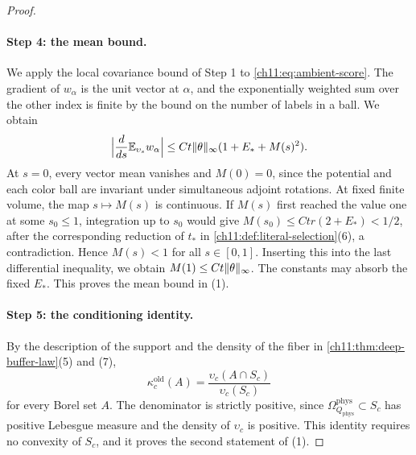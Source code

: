 \begin{proof}
\paragraph{Step 4: the mean bound.}
We apply the local covariance bound of Step 1 to \eqref{ch11:eq:ambient-score}. The gradient of $w_\alpha$ is the unit vector at $\alpha$, and the exponentially weighted sum over the other index is finite by the bound on the number of labels in a ball. We obtain
\[
 \Bigl\lvert\frac d{ds}\mathbb E_{\upsilon_s}w_\alpha\Bigr\rvert\le Ct\lVert \theta\rVert_\infty(1+E_*+M(s)^2).
\]
At $s=0$, every vector mean vanishes and $M(0)=0$, since the potential and each color ball are invariant under simultaneous adjoint rotations. At fixed finite volume, the map $s\mapsto M(s)$ is continuous. If $M(s)$ first reached the value one at some $s_0\le1$, integration up to $s_0$ would give $M(s_0)\le Ctr(2+E_*)<1/2$, after the corresponding reduction of $t_*$ in \cref{ch11:def:literal-selection}(6), a contradiction. Hence $M(s)<1$ for all $s\in[0,1]$. Inserting this into the last differential inequality, we obtain $M(1)\le Ct\lVert \theta\rVert_\infty$. The constants may absorb the fixed $E_*$. This proves the mean bound in (1).

\paragraph{Step 5: the conditioning identity.}
By the description of the support and the density of the fiber in \cref{ch11:thm:deep-buffer-law}(5) and (7),
\[
 \kappa_c^{\mathrm{old}}(A)=\frac{\upsilon_c(A\cap S_c)}{\upsilon_c(S_c)}
\]
for every Borel set $A$. The denominator is strictly positive, since $\Omega_{Q_{\mathrm{phys}}}^{\mathrm{phys}}\subset S_c$ has positive Lebesgue measure and the density of $\upsilon_c$ is positive. This identity requires no convexity of $S_c$, and it proves the second statement of (1).


\end{proof}

